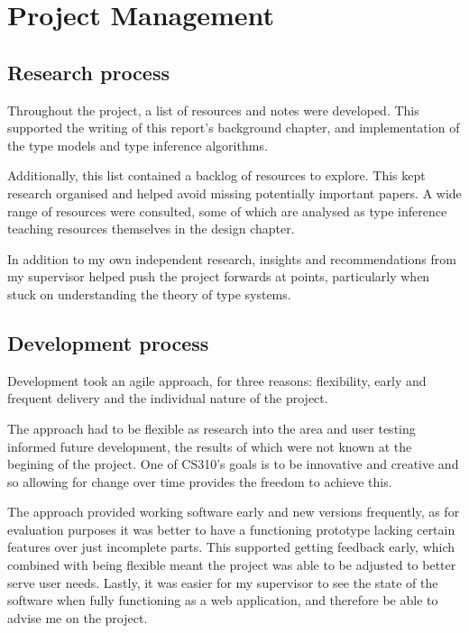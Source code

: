 \documentclass[a4paper,fleqn,oneside,12pt]{report}
\begin{document}
\chapter{Project Management}\label{id:h.3j8xp631ygy}

\section{Research process}\label{id:h.ew85fk610kqt}

Throughout the project, a list of resources and notes were developed. This supported the writing of this report's background chapter, and implementation of the type models and type inference algorithms.

Additionally, this list contained a backlog of resources to explore. This kept research organised and helped avoid missing potentially important papers. A wide range of resources were consulted, some of which are analysed as type inference teaching resources themselves in the design chapter.

In addition to my own independent research, insights and recommendations from my supervisor helped push the project forwards at points, particularly when stuck on understanding the theory of type systems.

\section{Development process}\label{id:h.3r2hzi490wg9}

Development took an agile approach, for three reasons: flexibility, early and frequent delivery and the individual nature of the project.

The approach had to be flexible as research into the area and user testing informed future development, the results of which were not known at the begining of the project. One of CS310's goals is to be innovative and creative and so allowing for change over time provides the freedom to achieve this.

The approach provided working software early and new versions frequently, as for evaluation purposes it was better to have a functioning prototype lacking certain features over just incomplete parts. This supported getting feedback early, which combined with being flexible meant the project was able to be adjusted to better serve user needs. Lastly, it was easier for my supervisor to see the state of the software when fully functioning as a web application, and therefore be able to advise me on the project.
\end{document}

